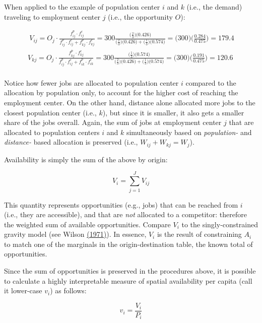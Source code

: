 \documentclass[]{elsarticle} %
\begin{document}
When applied to the example of population center \(i\) and \(k\) (i.e.,
the demand) traveling to employment center \(j\) (i.e., the opportunity
\(O\)):

\[
\begin{array}{l}\
V_{ij} = O_j\cdot \frac{f^p_{ij} \cdot f^c_{ij}}{f^p_{ij} \cdot f^c_{ij} + f^p_{kj} \cdot f^c_{kj}} = 300 \frac{\big(\frac{2}{3} \big) \big(0.426 \big)}{\big(\frac{2}{3} \big) \big(0.426 \big) + \big(\frac{1}{3} \big) \big(0.574 \big)} = \big(300 \big)\big(\frac{0.284}{0.475} \big)= 179.4\\
V_{kj} = O_j\cdot \frac{f^p_{kj} \cdot f^c_{kj}}{f^p_{ij} \cdot f^c_{ij} + f^p_{ik} \cdot f^c_{ik}} = 300 \frac{\big(\frac{1}{3} \big) \big(0.574 \big)}{\big(\frac{2}{3} \big) \big(0.426 \big) + \big(\frac{1}{3} \big) \big(0.574 \big)}  = \big(300 \big)\big(\frac{0.191}{0.475} \big)= 120.6 \\
\end{array}
\]

Notice how fewer jobs are allocated to population center \(i\) compared
to the allocation by population only, to account for the higher cost of
reaching the employment center. On the other hand, distance alone
allocated more jobs to the closest population center (i.e., \(k\)), but
since it is smaller, it also gets a smaller share of the jobs overall.
Again, the sum of jobs at employment center \(j\) that are allocated to
population centers \(i\) and \(k\) simultaneously based on
\emph{population-} and \emph{distance-} based allocation is preserved
(i.e., \(W_{ij} + W_{kj} = W_j\)).

Availability is simply the sum of the above by origin:

\[
V_i = \sum_{j=1}^J V_{ij}
\]

This quantity represents opportunities (e.g., jobs) that can be reached
from \(i\) (i.e., they are accessible), and that are \emph{not}
allocated to a competitor: therefore the weighted sum of available
opportunities. Compare \(V_i\) to the singly-constrained gravity model
(see Wilson \href{https://doi.org/10.1068/a030001}{(1971)}). In essence,
\(V_i\) is the result of constraining \(A_i\) to match one of the
marginals in the origin-destination table, the known total of
opportunities.

Since the sum of opportunities is preserved in the procedures above, it
is possible to calculate a highly interpretable measure of spatial
availability per capita (call it lower-case \(v_i\)) as follows:

\[
v_i = \frac{V_i}{P_i}
\]
\end{document}
